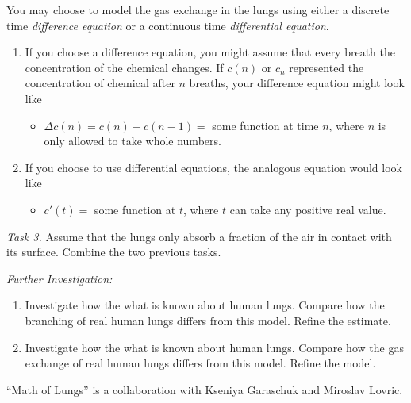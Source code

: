 \begin{graybox}
You may choose to model the gas exchange in the lungs using either a discrete time \emph{difference equation} or a continuous time \emph{differential equation}.
	\begin{enumerate}[label=\emph{(\alph*)}]
	\item If you choose a difference equation, you might assume that every breath the concentration of the chemical changes. If $c(n)$ or $c_n$ represented the concentration of chemical after $n$ breaths, your difference equation might look like
	\begin{itemize}
		\item $\Delta c(n) = c(n) - c(n-1) =$ some function at time $n$, where $n$ is only allowed to take whole numbers.
	\end{itemize}

	\item If you choose to use differential equations, the analogous equation would look like
	\begin{itemize}
		\item $c'(t)=$ some function at $t$, where $t$ can take any positive real value.  
	\end{itemize}
\end{enumerate}
\end{graybox}

\vfill

\emph{Task 3. } Assume that the lungs only absorb a fraction of the air in contact with its surface. Combine the two previous tasks.

\vfill

\emph{Further Investigation:}
\begin{enumerate}[label=\emph{\arabic*.}]
	\item Investigate how the what is known about human lungs. Compare how the branching of real human lungs differs from this model. Refine the estimate.
	\item Investigate how the what is known about human lungs. Compare how the gas exchange of real human lungs differs from this model. Refine the model.
\end{enumerate}

\vspace{1cm}



\hfill ``Math of Lungs'' is a collaboration with Kseniya Garaschuk and Miroslav Lovric.

\begin{noexercises}
\end{noexercises}
